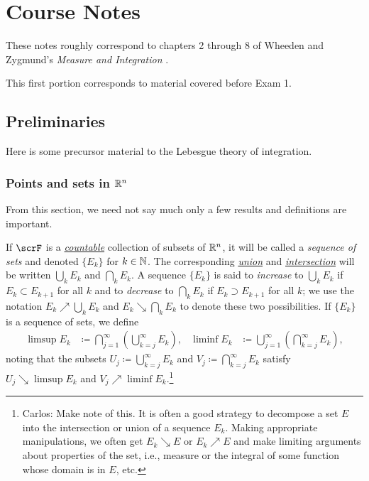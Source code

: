 \chapter{Course Notes}
\thispagestyle{empty}
These notes roughly correspond to chapters 2 through 8 of Wheeden and
Zygmund's \emph{Measure and Integration}
\cite{wheeden-zygmund:measure-and-integral}.

This first portion corresponds to material covered before Exam 1.
\section{Preliminaries}
Here is some precursor material to the Lebesgue theory of integration.
\subsection{Points and sets in $\mathbb{R}^n$}
From this section, we need not say much only a few results and definitions
are important.

\bigskip

If $\scrF$ is a
\href{https://en.wikipedia.org/wiki/Countable}{\emph{countable}} collection
of subsets of $\mathbb{R}^n$, it will be called a \emph{sequence of sets} and
denoted $\{E_k\}$ for $k\in\mathbb{N}$. The corresponding
\href{https://en.wikipedia.org/wiki/Union_(set_theory)}{\emph{union}} and
\href{https://en.wikipedia.org/wiki/Intersection_(set_theory)}{\emph{intersection}}
will be written $\bigcup_k E_k$ and $\bigcap_k E_k$. A sequence $\{E_k\}$
is said to \emph{increase} to $\bigcup_k E_k$ if $E_k\subset E_{k+1}$ for
all $k$ and to \emph{decrease} to $\bigcap_k E_k$ if $E_k\supset E_{k+1}$
for all $k$; we use the notation $E_k\nearrow \bigcup_k E_k$ and
$E_k\searrow\bigcap_k E_k$ to denote these two possibilities. If $\{E_k\}$
is a sequence of sets, we define
\begin{equation}
\label{eq:1:set-limsup-liminf}
\begin{aligned}
\limsup E_k
&\coloneqq\bigcap_{j=1}^\infty\left(\bigcup_{k=j}^\infty E_k\right),&
\liminf E_k&\coloneqq\bigcup_{j=1}^\infty\left(\bigcap_{k=j}^\infty E_k\right),
\end{aligned}
\end{equation}
noting that the subsets $U_j\coloneqq\bigcup_{k=j}^\infty E_k$ and
$V_j\coloneqq\bigcap_{k=j}^\infty E_k$ satisfy $U_j\searrow\limsup E_k$ and
$V_j\nearrow\liminf E_k$.\footnote{Carlos: Make note of this. It is often a
good strategy to decompose a set $E$ into the intersection or union of a
sequence $E_k$. Making appropriate manipulations, we often get $E_k\searrow
E$ or $E_k\nearrow E$ and make limiting arguments about properties of the
set, i.e., measure or the integral of some function whose domain is in $E$,
etc.}
